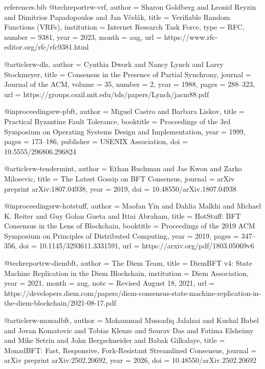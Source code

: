 \begin{filecontents*}{references.bib}
@techreport{rw-vrf,
  author = {Sharon Goldberg and Leonid Reyzin and Dimitrios Papadopoulos and Jan V{\v c}el{\'a}k},
  title = {Verifiable Random Functions ({VRFs})},
  institution = {Internet Research Task Force},
  type = {RFC},
  number = {9381},
  year = {2023},
  month = aug,
  url = {https://www.rfc-editor.org/rfc/rfc9381.html}
}

@article{rw-dls,
  author = {Cynthia Dwork and Nancy Lynch and Larry Stockmeyer},
  title = {Consensus in the Presence of Partial Synchrony},
  journal = {Journal of the ACM},
  volume = {35},
  number = {2},
  year = {1988},
  pages = {288--323},
  url = {https://groups.csail.mit.edu/tds/papers/Lynch/jacm88.pdf}
}

@inproceedings{rw-pbft,
  author = {Miguel Castro and Barbara Liskov},
  title = {Practical Byzantine Fault Tolerance},
  booktitle = {Proceedings of the 3rd Symposium on Operating Systems Design and Implementation},
  year = {1999},
  pages = {173--186},
  publisher = {USENIX Association},
  doi = {10.5555/296806.296824}
}

@article{rw-tendermint,
  author = {Ethan Buchman and Jae Kwon and Zarko Milosevic},
  title = {The Latest Gossip on {BFT} Consensus},
  journal = {arXiv preprint arXiv:1807.04938},
  year = {2019},
  doi = {10.48550/arXiv.1807.04938}
}

@inproceedings{rw-hotstuff,
  author = {Maofan Yin and Dahlia Malkhi and Michael K. Reiter and Guy Golan Gueta and Ittai Abraham},
  title = {{HotStuff}: {BFT} Consensus in the Lens of Blockchain},
  booktitle = {Proceedings of the 2019 ACM Symposium on Principles of Distributed Computing},
  year = {2019},
  pages = {347--356},
  doi = {10.1145/3293611.3331591},
  url = {https://arxiv.org/pdf/1803.05069v6}
}

@techreport{rw-diembft,
  author = {{The Diem Team}},
  title = {{DiemBFT} v4: State Machine Replication in the {Diem} Blockchain},
  institution = {Diem Association},
  year = {2021},
  month = aug,
  note = {Revised August 18, 2021},
  url = {https://developers.diem.com/papers/diem-consensus-state-machine-replication-in-the-diem-blockchain/2021-08-17.pdf}
}

@article{rw-monadbft,
  author = {Mohammad Mussadiq Jalalzai and Kushal Babel and Jovan Komatovic and Tobias Klenze and Sourav Das and Fatima Elsheimy and Mike Setrin and John Bergschneider and Babak Gilkalaye},
  title = {{MonadBFT}: Fast, Responsive, Fork-Resistant Streamlined Consensus},
  journal = {arXiv preprint arXiv:2502.20692},
  year = {2026},
  doi = {10.48550/arXiv.2502.20692}
}


\end{filecontents*}

